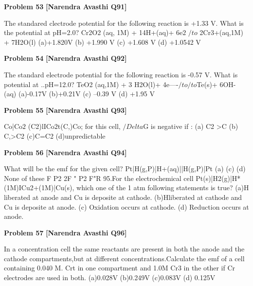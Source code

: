 \begin{problembox}
\textbf{Problem 53} \hfill \textbf{[Narendra Avasthi Q91]}
\label{q:ext-narendra_avasthi_all_questions-53}

The standared clectrode potential for the following reaction is +1.33 V. What is the potential
at pH=2.0?
Cr2O2 (aq, 1M) + 14H+(aq)+ 6e$2$ $/to$ 2Cr3+(aq,1M) + 7H2O(l)
(a)+1.820V
(b) +1.990 V
(c) +1.608 V
(d) +1.0542 V
\end{problembox}

\begin{problembox}
\textbf{Problem 54} \hfill \textbf{[Narendra Avasthi Q92]}
\label{q:ext-narendra_avasthi_all_questions-54}

The standard electrode potential for the following reaction is -0.57 V. What is potential at
..pH=12.0?
TeO2 (aq,1M) + 3 H2O(l)+ 4e----$/to$$/to$Te(s)+ 6OH- (aq)
(a)-0.17V
(b)+0.21V
(c) --0.39 V
(d) +1.95 V
\end{problembox}

\begin{problembox}
\textbf{Problem 55} \hfill \textbf{[Narendra Avasthi Q93]}
\label{q:ext-narendra_avasthi_all_questions-55}

Co|Co$2$ (C2)lICo$2$t(C,)Co; for this cell, $/Delta$G is negative if :
(a) C2 >C
(b) C,>C2
(c)C=C2
(d)unpredictable
\end{problembox}

\begin{problembox}
\textbf{Problem 56} \hfill \textbf{[Narendra Avasthi Q94]}
\label{q:ext-narendra_avasthi_all_questions-56}

What will be the emf for the given cell?
Pt|H(g,P)|H+(aq)||H(g,P)|Pt
(a)
(c)
(d) None of these
F
P2
2F " P2
F"R
95.For the electrochemical cell Pt(s)|H2(g)|H*(1M)ICu2+(1M)|Cu(s), which one of the
1 atm
following statements is true?
(a)H liberated at anode and Cu is deposite at cathode.
(b)Hliberated at cathode and Cu is deposite at anode.
(c) Oxidation occurs at cathode.
(d) Reduction occurs at anode.
\end{problembox}

\begin{problembox}
\textbf{Problem 57} \hfill \textbf{[Narendra Avasthi Q96]}
\label{q:ext-narendra_avasthi_all_questions-57}

In a concentration cell the same reactants are present in both the anode and the cathode
compartments,but at different concentrations.Calculate the emf of a cell containing 0.040 M.
Crt in one compartment and 1.0M Cr3 in the other if Cr electrodes are used in both.
(a)0.028V
(b)0.249V
(c)0.083V
(d) 0.125V
\end{problembox}

